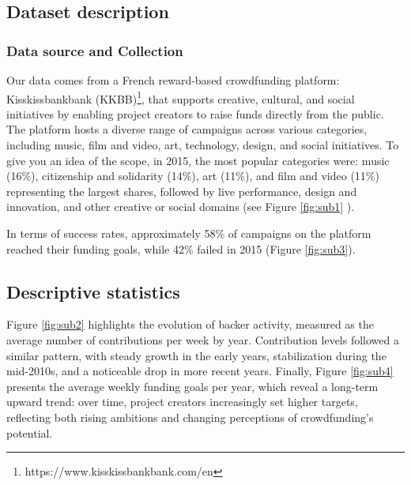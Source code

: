 \subsection{Dataset description}\label{appendix:data_description}

\subsubsection{Data source and Collection }
Our data comes from a French reward-based crowdfunding platform: Kisskissbankbank (KKBB)\footnote{https://www.kisskissbankbank.com/en}, that supports creative, cultural, and social initiatives by enabling project creators to raise funds directly from the public. 
The platform hosts a diverse range of campaigns across various categories, including music, film and video, art, technology, design, and social initiatives.
To give you an idea of the scope, in 2015, the most popular categories were:  music (16\%), citizenship and solidarity (14\%), art (11\%), and film and video (11\%) representing the largest shares, followed by live performance, design and innovation, and other creative or social domains (see Figure \ref{fig:sub1} ). 

In terms of success rates, approximately 58\% of campaigns on the platform reached their funding goals, while 42\% failed in 2015 (Figure \ref{fig:sub3}). 

\subsection{Descriptive statistics}

Figure \ref{fig:sub2} highlights the evolution of backer activity, measured as the average number of contributions per week by year. Contribution levels followed a similar pattern, with steady growth in the early years, stabilization during the mid-2010s, and a noticeable drop in more recent years. Finally, Figure \ref{fig:sub4} presents the average weekly funding goals per year, which reveal a long-term upward trend: over time, project creators increasingly set higher targets, reflecting both rising ambitions and changing perceptions of crowdfunding’s potential.

